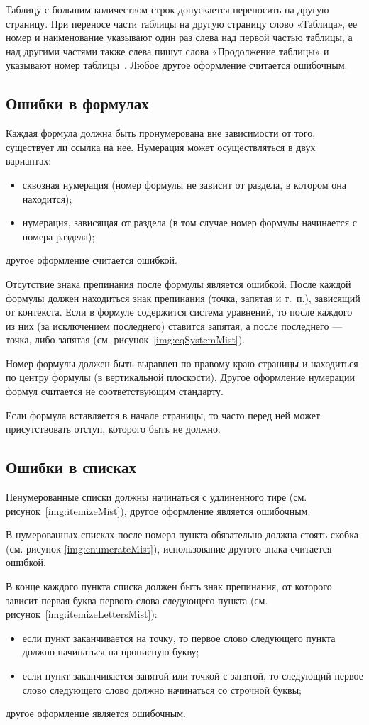 Таблицу с большим количеством строк допускается переносить на другую страницу. При переносе части таблицы на другую страницу слово «Таблица», ее номер и наименование указывают один раз слева над первой частью таблицы, а над другими частями также слева пишут слова «Продолжение таблицы» и указывают номер таблицы~\cite{GOST732}. Любое другое оформление считается ошибочным.

\subsection{Ошибки в формулах}
Каждая формула должна быть пронумерована вне зависимости от того, существует ли ссылка на нее. Нумерация может осуществляться в двух вариантах:
\begin{itemize}
	\item сквозная нумерация (номер формулы не зависит от раздела, в котором она находится);
	\item нумерация, зависящая от раздела (в том случае номер формулы начинается с номера раздела);
\end{itemize}
другое оформление считается ошибкой.

Отсутствие знака препинания после формулы является ошибкой. После каждой формулы должен находиться знак препинания (точка, запятая и т.~п.), зависящий от контекста. Если в формуле содержится система уравнений, то после каждого из них (за исключением последнего) ставится запятая, а после последнего --- точка, либо запятая (см. рисунок~\ref{img:eqSystemMist}).

Номер формулы должен быть выравнен по правому краю страницы и находиться по центру формулы (в вертикальной плоскости). Другое оформление нумерации формул считается не соответствующим стандарту.

Если формула вставляется в начале страницы, то часто перед ней может присутствовать отступ, которого быть не должно.

\subsection{Ошибки в списках}
Ненумерованные списки должны начинаться с удлиненного тире (см. рисунок~\ref{img:itemizeMist}), другое оформление является ошибочным.

В нумерованных списках после номера пункта обязательно должна стоять скобка (см. рисунок \ref{img:enumerateMist}), использование другого знака считается ошибкой.

В конце каждого пункта списка должен быть знак препинания, от которого зависит первая буква первого слова следующего пункта (см. рисунок~\ref{img:itemizeLettersMist}):
\begin{itemize}
	\item если пункт заканчивается на точку, то первое слово следующего пункта должно начинаться на прописную букву;
	\item если пункт заканчивается запятой или точкой с запятой, то следующий первое слово следующего слово должно начинаться со строчной буквы;
\end{itemize}
другое оформление является ошибочным.

